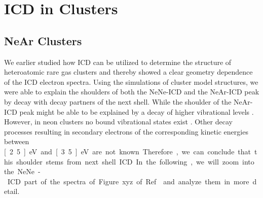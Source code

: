 \section{ICD in Clusters}
\label{sec:clusters}

\subsection{NeAr Clusters}
We earlier studied how ICD can be utilized to determine the structure of
heteroatomic rare gas clusters \cite{Fasshauer14_1} and thereby showed a clear
geometry dependence of the ICD electron spectra. Using the simulations of
cluster model structures, we were able to explain the shoulders of both
the NeNe-ICD and the NeAr-ICD peak by decay with decay partners of the next
shell. While the shoulder of the NeAr-ICD peak might be able to be explained
by a decay of higher vibrational levels \cite{Scheit06}. However, in neon
clusters no bound vibrational states exist \cite{}.
Other decay processes resulting in secondary electrons of the corresponding
kinetic energies between \unit[2.5]{eV} and \unit[3.5]{eV} are not known.
Therefore, we can conclude that this shoulder stems from next shell ICD.
In the following, we will zoom into the NeNe-ICD part of the spectra
of Figure xyz of Ref. \cite{Fasshauer14_1} and analyze them in more detail.


